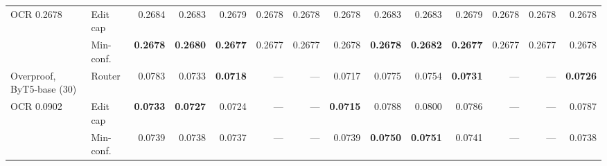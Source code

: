 \begin{tabular}{llrrrrrr@{\hskip 10pt}rrrrrr}
\quad OCR 0.2678 & Edit cap & 0.2684 & 0.2683 & 0.2679 & 0.2678 & 0.2678 & 0.2678 & 0.2683 & 0.2683 & 0.2679 & 0.2678 & 0.2678 & 0.2678 \\
 & Min-conf. & \textbf{0.2678} & \textbf{0.2680} & \textbf{0.2677} & 0.2677 & 0.2677 & 0.2678 & \textbf{0.2678} & \textbf{0.2682} & \textbf{0.2677} & 0.2677 & 0.2677 & 0.2678 \\
\addlinespace[2pt]
Overproof, ByT5-base (30) & Router & 0.0783 & 0.0733 & \textbf{0.0718} & — & — & 0.0717 & 0.0775 & 0.0754 & \textbf{0.0731} & — & — & \textbf{0.0726} \\
\quad OCR 0.0902 & Edit cap & \textbf{0.0733} & \textbf{0.0727} & 0.0724 & — & — & \textbf{0.0715} & 0.0788 & 0.0800 & 0.0786 & — & — & 0.0787 \\
 & Min-conf. & 0.0739 & 0.0738 & 0.0737 & — & — & 0.0739 & \textbf{0.0750} & \textbf{0.0751} & 0.0741 & — & — & 0.0738 \\
\bottomrule
\end{tabular}
